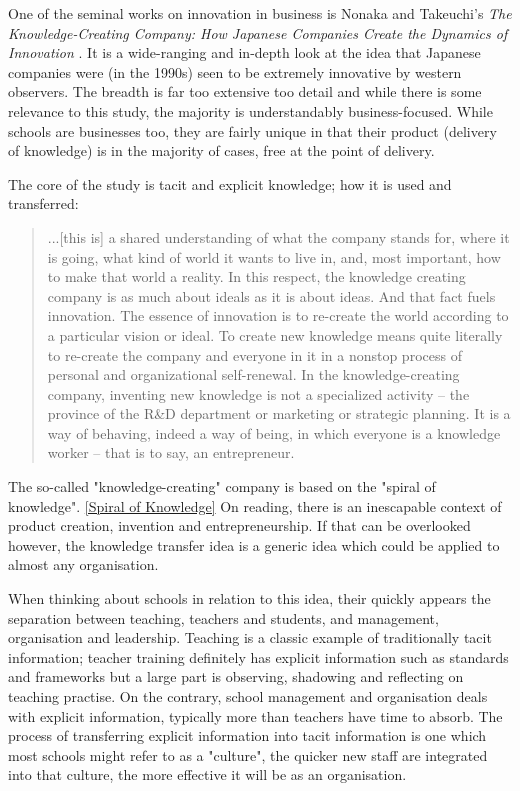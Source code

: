 One of the seminal works on innovation in business is Nonaka and Takeuchi's \textit{The Knowledge-Creating Company: How Japanese Companies Create the Dynamics of Innovation} \cite{nonaka1995knowledge}. It is a wide-ranging and in-depth look at the idea that Japanese companies were (in the 1990s) seen to be extremely innovative by western observers. The breadth is far too extensive too detail and while there is some relevance to this study, the majority is understandably business-focused. While schools are businesses too, they are fairly unique in that their product (delivery of knowledge) is in the majority of cases, free at the point of delivery.

The core of the study is tacit and explicit knowledge; how it is used and transferred:

\begin{quote}
...[this is] a shared understanding of what the company stands for, where it is going, what kind of world it wants to live in, and, most important, how to make that world a reality. In this respect, the knowledge creating company is as much about ideals as it is about ideas. And that fact fuels innovation. The essence of innovation is to re-create the world according to a particular vision or ideal. To create new knowledge means quite literally to re-create the company and everyone in it in a nonstop process of personal and organizational self-renewal. In the knowledge-creating company, inventing new knowledge is not a specialized activity – the province of the R&D department or marketing or strategic planning. It is a way of behaving, indeed a way of being, in which everyone is a knowledge worker – that is to say, an entrepreneur.
\end{quote}

The so-called "knowledge-creating" company is based on the "spiral of knowledge". \ref{Spiral of Knowledge} On reading, there is an inescapable context of product creation, invention and entrepreneurship. If that can be overlooked however, the knowledge transfer idea is a generic idea which could be applied to almost any organisation.

When thinking about schools in relation to this idea, their quickly appears the separation between teaching, teachers and students, and management, organisation and leadership. Teaching is a classic example of traditionally tacit information; teacher training definitely has explicit information such as standards and frameworks but a large part is observing, shadowing and reflecting on teaching practise. On the contrary, school management and organisation deals with explicit information, typically more than teachers have time to absorb. The process of transferring explicit information into tacit information is one which most schools might refer to as a "culture", the quicker new staff are integrated into that culture, the more effective it will be as an organisation.


